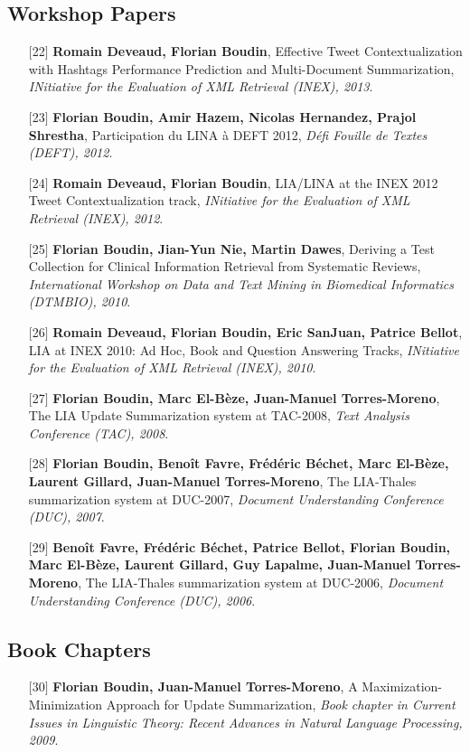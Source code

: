 \documentclass[11pt,a4paper]{moderncv}
\begin{document}
    \subsection{Workshop Papers}
    \begin{itemize}[leftmargin=1.2cm,itemsep=0.1cm]
        \item[{\small$[$22$]$}] \textbf{Romain Deveaud, Florian Boudin}, Effective Tweet Contextualization with Hashtags Performance Prediction and Multi-Document Summarization, \textit{INitiative for the Evaluation of XML Retrieval (INEX), 2013}.
        \item[{\small$[$23$]$}] \textbf{Florian Boudin, Amir Hazem, Nicolas Hernandez, Prajol Shrestha}, Participation du LINA à DEFT 2012, \textit{Défi Fouille de Textes (DEFT), 2012}.
        \item[{\small$[$24$]$}] \textbf{Romain Deveaud, Florian Boudin}, LIA/LINA at the INEX 2012 Tweet Contextualization track, \textit{INitiative for the Evaluation of XML Retrieval (INEX), 2012}.
        \item[{\small$[$25$]$}] \textbf{Florian Boudin, Jian-Yun Nie, Martin Dawes}, Deriving a Test Collection for Clinical Information Retrieval from Systematic Reviews, \textit{International Workshop on Data and Text Mining in Biomedical Informatics (DTMBIO), 2010}.
        \item[{\small$[$26$]$}] \textbf{Romain Deveaud, Florian Boudin, Eric SanJuan, Patrice Bellot}, LIA at INEX 2010: Ad Hoc, Book and Question Answering Tracks, \textit{INitiative for the Evaluation of XML Retrieval (INEX), 2010}.
        \item[{\small$[$27$]$}] \textbf{Florian Boudin, Marc El-Bèze, Juan-Manuel Torres-Moreno}, The LIA Update Summarization system at TAC-2008, \textit{Text Analysis Conference (TAC), 2008}.
        \item[{\small$[$28$]$}] \textbf{Florian Boudin, Benoît Favre, Frédéric Béchet, Marc El-Bèze, Laurent Gillard, Juan-Manuel Torres-Moreno}, The LIA-Thales summarization system at DUC-2007, \textit{Document Understanding Conference (DUC), 2007}.
        \item[{\small$[$29$]$}] \textbf{Benoît Favre, Frédéric Béchet, Patrice Bellot, Florian Boudin, Marc El-Bèze, Laurent Gillard, Guy Lapalme, Juan-Manuel Torres-Moreno}, The LIA-Thales summarization system at DUC-2006, \textit{Document Understanding Conference (DUC), 2006}.
    \end{itemize}
    \subsection{Book Chapters}
    \begin{itemize}[leftmargin=1.2cm,itemsep=0.1cm]
        \item[{\small$[$30$]$}] \textbf{Florian Boudin, Juan-Manuel Torres-Moreno}, A Maximization-Minimization Approach for Update Summarization, \textit{Book chapter in Current Issues in Linguistic Theory: Recent Advances in Natural Language Processing, 2009}.
    \end{itemize}
\end{document}
